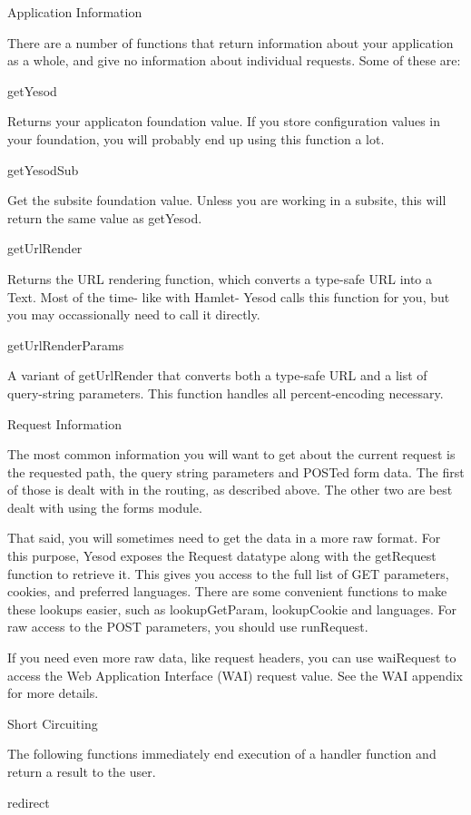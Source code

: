 Application Information

There are a number of functions that return information about your
application as a whole, and give no information about individual
requests. Some of these are:

getYesod

Returns your applicaton foundation value. If you store configuration
values in your foundation, you will probably end up using this
function a lot.

getYesodSub

Get the subsite foundation value. Unless you are working in a subsite,
this will return the same value as getYesod.

getUrlRender

Returns the URL rendering function, which converts a type-safe URL
into a Text. Most of the time- like with Hamlet- Yesod calls this
function for you, but you may occassionally need to call it directly.

getUrlRenderParams

A variant of getUrlRender that converts both a type-safe URL and a
list of query-string parameters. This function handles all
percent-encoding necessary.

Request Information

The most common information you will want to get about the current
request is the requested path, the query string parameters and POSTed
form data. The first of those is dealt with in the routing, as
described above. The other two are best dealt with using the forms
module.

That said, you will sometimes need to get the data in a more raw
format. For this purpose, Yesod exposes the Request datatype along
with the getRequest function to retrieve it. This gives you access to
the full list of GET parameters, cookies, and preferred
languages. There are some convenient functions to make these lookups
easier, such as lookupGetParam, lookupCookie and languages. For raw
access to the POST parameters, you should use runRequest.

If you need even more raw data, like request headers, you can use
waiRequest to access the Web Application Interface (WAI) request
value. See the WAI appendix for more details.

Short Circuiting

The following functions immediately end execution of a handler
function and return a result to the user.

redirect

